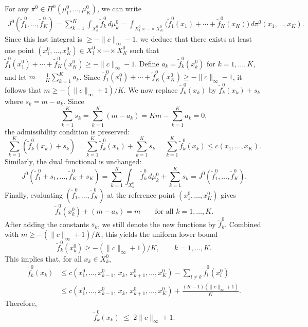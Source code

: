 \documentclass[twoside,11pt,a4paper]{article}
\begin{document}
For any $\pi^0 \in \Pi^0(\mu_1^0,\dots,\mu_K^0)$, we can write
\begin{align*}
J^0(\widetilde{f}_1^0,\dots,\widetilde{f}_K^0)
=\sum_{k=1}^K \int_{X_k^0} \widetilde{f}_k^0\, d\mu_k^0
=\int_{X_1^0\times\cdots\times X_K^0}
\big(\widetilde{f}_1^0(x_1)+\cdots+\widetilde{f}_K^0(x_K)\big)
\, d\pi^0(x_1,\dots,x_K).
\end{align*}
Since this last integral is $\ge -\|c\|_\infty-1$, we deduce that there exists at least one point
$(x_1^0,\dots,x_K^0)\in X_1^0\times\cdots\times X_K^0$ such that
$\widetilde{f}_1^0(x_1^0)+\cdots+\widetilde{f}_K^0(x_K^0)
\ge -\|c\|_\infty-1$. Define $a_k=\widetilde{f}_k^0(x_k^0) \text{ for } k=1,\dots,K$, and let $m=\frac{1}{K}\sum_{k=1}^K a_k$. Since $\widetilde{f}_1^0(x_1^0)+\cdots+\widetilde{f}_K^0(x_K^0)
\ge -\|c\|_\infty-1$, it follows that $m\ge -(\|c\|_\infty+1)/K$.
We now replace $\widetilde{f}_k^0(x_k)$ by $\widetilde{f}_k^0(x_k)+s_k$ where $s_k=m-a_k$. Since
\begin{equation*}
\sum_{k=1}^K s_k=\sum_{k=1}^K (m-a_k)=Km-\sum_{k=1}^K a_k = 0,
\end{equation*}
the admissibility condition is preserved:
\begin{equation*}
\sum_{k=1}^K (\widetilde{f}_k^0(x_k)+s_k)
=
\sum_{k=1}^K \widetilde{f}_k^0(x_k)
+\sum_{k=1}^K s_k
=
\sum_{k=1}^K \widetilde{f}_k^0(x_k)
\le c(x_1,\dots,x_K).
\end{equation*}
Similarly, the dual functional is unchanged:
\begin{equation*}
J^0(\widetilde{f}_1^0+s_1,\dots,\widetilde{f}_K^0+s_K)
=
\sum_{k=1}^K\int_{X_k^0}\widetilde{f}_k^0\, d\mu_k^0
+\sum_{k=1}^K s_k
=
J^0(\widetilde{f}_1^0,\dots,\widetilde{f}_K^0).
\end{equation*}
Finally, evaluating $(\widetilde{f}_1^0,\ldots,\widetilde{f}_K^0) $ at the reference point 
$(x_1^0,\dots,x_K^0)$ gives
\begin{equation*}
\widetilde{f}_k^0(x_k^0)+(m-a_k)
=
m
\qquad\text{for all } k=1,\dots,K.
\end{equation*}
After adding the constants $s_k$, we still denote the new functions by $\widetilde{f}_k^0$. Combined with $m\ge -(\|c\|_\infty+1)/K$, this yields the uniform lower bound
\begin{equation}\label{rr}
\widetilde{f}_k^0(x_k^0)\ge -(\|c\|_\infty+1)/K,\qquad k=1,\dots,K.
\end{equation}
This implies that, for all $x_k\in X_k^0$,
\begin{align*}
\widetilde{f}_k^0(x_k)
&\leq
c(x_1^0,\dots,x_{k-1}^0,\,x_k,\,x_{k+1}^0,\dots,x_K^0)
-
\sum_{l\ne k}\widetilde{f}_l^0(x_l^0)
\\
&\leq
c(x_1^0,\dots,x_{k-1}^0,\,x_k,\,x_{k+1}^0,\dots,x_K^0)
+
\frac{(K-1)(\|c\|_\infty+1)}{K}.
\end{align*}
Therefore,
\begin{align}\label{tild}
\widetilde{f}_k^0(x_k)
\;\le\; 2\|c\|_\infty +1 .
\end{align}
\end{document}
